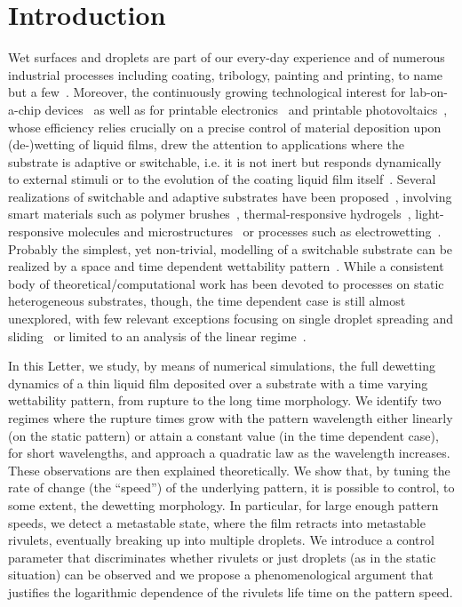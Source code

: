 \section{Introduction} Wet surfaces and droplets are part of our every-day experience and of numerous industrial processes including coating, tribology, painting and printing, to name but a few~\cite{gross1980fluid,szeri2010fluid,DERYCK1998278,doi:10.1146/annurev.fluid.31.1.347,DASILVASOBRINHO19991204,singh2010inkjet,jo2009evaluation,Wijshoff2010}. 
Moreover, the continuously growing technological interest for lab-on-a-chip devices~\cite{C6LC00387G,Focke} as well as for printable electronics~\cite{Kim_2005, Luechinger_2008} and printable photovoltaics~\cite{Brabec2001,RH20}, whose efficiency relies crucially on a precise control of material deposition upon (de-)wetting of liquid films, drew the attention to applications where the substrate is adaptive or switchable, i.e. it is not inert but responds dynamically to external stimuli or to the evolution of the coating liquid film itself~\cite{ButtEtAl_Langmuir2018,GuoGuo_RSCAdv2016}. 
Several realizations of switchable and adaptive substrates have been proposed~\cite{LiuChem2005, XiCSR2010}, involving smart materials such as polymer brushes~\cite{CohenStuartEtAl_NatMat2010,ayres2007stimuli,YongEtAl_Mat2018}, thermal-responsive hydrogels~\cite{ChenEtAl_SM2010}, light-responsive molecules and microstructures~\cite{IchimuraEtAl_Science2000,DelormeEtAl_Langmuir2005,OscuratoEtAl_AAMI2017} or processes such as electrowetting~\cite{MugeleEtAl_JPCM2005}.
Probably the simplest, yet non-trivial, modelling of a switchable substrate can be realized by a space and time dependent wettability pattern~\cite{D0SM02082F}. 
While a consistent body of theoretical/computational work has been devoted to processes on static heterogeneous substrates, though, the time dependent case is still almost unexplored, with few relevant exceptions focusing on single droplet spreading and sliding~\cite{D0SM02082F,GrawitterStark2,ThieleHartmann} or limited to an analysis of the linear regime~\cite{suman2006dynamics}.

In this Letter, we study, by means of numerical simulations, the full dewetting dynamics of a thin liquid film deposited over a substrate with a time varying wettability pattern, from rupture to the long time morphology. 
We identify two regimes where the rupture times grow with the pattern wavelength either linearly (on the static pattern) or attain a constant value (in the time dependent case), for short wavelengths, and approach a quadratic law as the wavelength increases. These observations are then explained theoretically.
We show that, by tuning the rate of change (the ``speed'') of the underlying pattern, it is possible to control, to some extent, the dewetting morphology. In particular, for large enough pattern speeds, we detect a metastable state, where the film retracts into metastable rivulets, eventually breaking up into multiple droplets.
We introduce a control parameter that discriminates whether rivulets or just droplets (as in the static situation)
can be observed and we propose a phenomenological argument that justifies the logarithmic dependence of the rivulets life time on the pattern speed.

